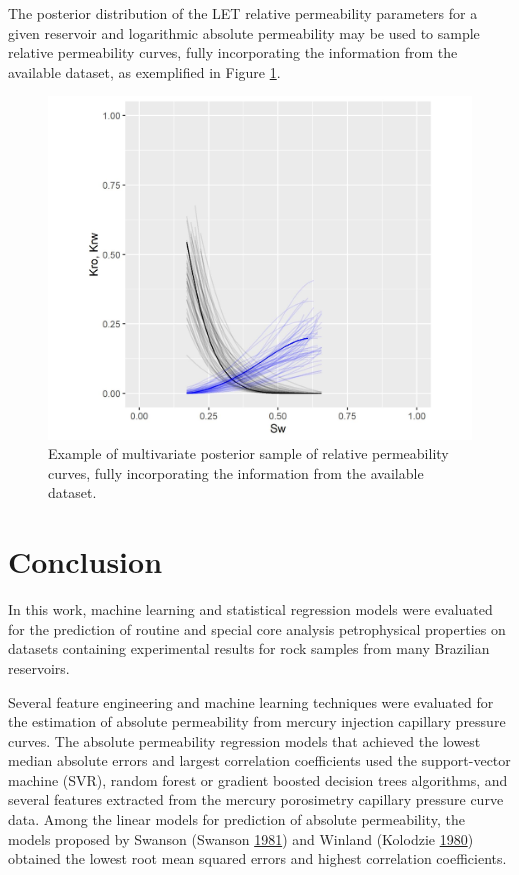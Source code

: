 \documentclass[english,msc,numbers]{coppe}
\begin{document}
  The posterior distribution of the LET relative permeability parameters for a given reservoir and logarithmic absolute permeability may be used to sample relative permeability curves, fully incorporating the information from the available dataset, as exemplified in Figure \ref{fig:multi-task}.
  \begin{figure}
  
  {\centering \includegraphics[width=0.8\linewidth]{figure/4-16-multi-task} 
  
  }
  
  \caption{Example of multivariate posterior sample of relative permeability curves, fully incorporating the information from the available dataset.}\label{fig:multi-task}
  \end{figure}
  \hypertarget{conclusion}{%
  \chapter*{Conclusion}\label{conclusion}}
  
  In this work, machine learning and statistical regression models were evaluated for the prediction of routine and special core analysis petrophysical properties on datasets containing experimental results for rock samples from many Brazilian reservoirs.
  
  Several feature engineering and machine learning techniques were evaluated for the estimation of absolute permeability from mercury injection capillary pressure curves. The absolute permeability regression models that achieved the lowest median absolute errors and largest correlation coefficients used the support-vector machine (SVR), random forest or gradient boosted decision trees algorithms, and several features extracted from the mercury porosimetry capillary pressure curve data. Among the linear models for prediction of absolute permeability, the models proposed by Swanson (Swanson \protect\hyperlink{ref-Swanson1981}{1981}) and Winland (Kolodzie \protect\hyperlink{ref-Kolodzie1980}{1980}) obtained the lowest root mean squared errors and highest correlation coefficients.
  
\end{document}
